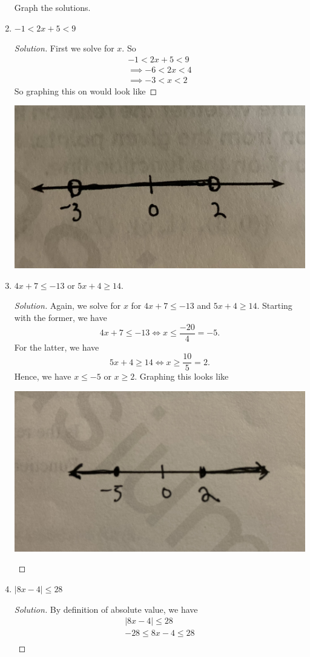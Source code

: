 \documentclass{article}
\begin{document}
\begin{enumerate}
    Graph the solutions.
\item \( -1 < 2x + 5 < 9 \) 
    \begin{proof}[Solution]
    First we solve for \(x\). So 
    \begin{align*}
        -1 < 2x+5 < 9  \\
        \implies -6 < 2x < 4 \\
        \implies -3 < x < 2
    \end{align*}
    So graphing this on would look like 
    \end{proof}
    \begin{center}
        \includegraphics[width = 0.5 \textwidth]{49}
    \end{center}
\item \( 4x+7 \leq -13 \) or \( 5x+4 \geq 14\).
    \begin{proof}[Solution]
    Again, we solve for \( x \) for \( 4x + 7 \leq -13  \) and \( 5x + 4 \geq 14\). Starting with the former, we have 
    \[ 4x + 7 \leq -13 \iff x \leq \frac{-20 }{4} = -5. \]
    For the latter, we have 
    \[ 5x + 4 \geq 14 \iff x \geq \frac{10}{5} = 2.\]
    Hence, we have \( x \leq -5 \) or \( x \geq 2 \). Graphing this looks like
    \begin{center}
        \includegraphics[width = 0.5 \textwidth]{50}
    \end{center}
    \end{proof}
\item \( |8x-4| \leq 28\)
    \begin{proof}[Solution]
    By definition of absolute value, we have 
    \begin{align*}
        |8x - 4 |\leq 28 \\
     -28 \leq 8x - 4 \leq 28 \\

\end{align*}
\end{proof}
\end{enumerate}
\end{document}
